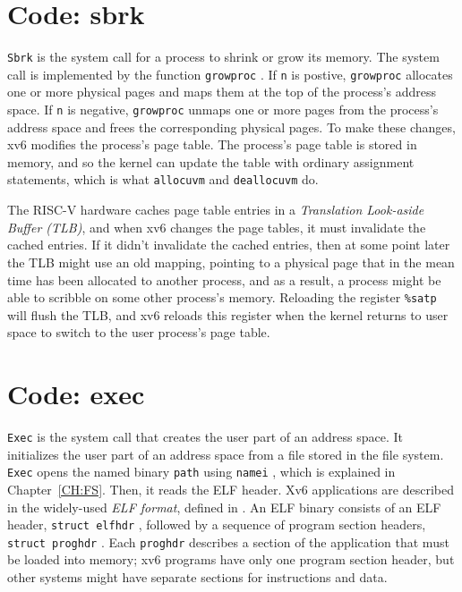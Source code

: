 \section{Code: sbrk}
\lstinline{Sbrk}
is the system call for a process to shrink or grow its memory. The system
call is implemented by the function
\lstinline{growproc}
.
If
\lstinline{n}
is postive,
\lstinline{growproc}
allocates one or more physical pages and maps them at the top of the process's
address space.  If
\lstinline{n}
is negative,
\lstinline{growproc}
unmaps one or more pages from the process's address space and frees the corresponding
physical pages.
To make these changes,
xv6 modifies the process's page table.  The process's page table is stored in
memory, and so the kernel can update the table with ordinary assignment
statements, which is what
\lstinline{allocuvm}
and
\lstinline{deallocuvm}
do.

The RISC-V hardware caches page table entries in a
\textit{Translation Look-aside Buffer (TLB)},
and when xv6 changes the page tables, it must invalidate the cached entries.  If
it didn't invalidate the cached entries, then at some point later the TLB might
use an old mapping, pointing to a physical page that in the mean time has been
allocated to another process, and as a result, a process might be able to
scribble on some other process's memory.  Reloading the register
\texttt{\%satp}
will flush the TLB, and xv6 reloads this register
when the kernel returns to user space to switch to the user process's
page table.
\section{Code: exec}
\lstinline{Exec}
is the system call that creates the user part of an address space.  It
initializes the user part of an address space from a file stored in the file
system.
\lstinline{Exec}
opens the named binary
\lstinline{path}
using
\lstinline{namei}
,
which is explained in Chapter~\ref{CH:FS}.
Then, it reads the ELF header. Xv6 applications are described in the widely-used
\textit{ELF format},
defined in
.
An ELF binary consists of an ELF header,
\lstinline{struct elfhdr}
,
followed by a sequence of program section headers,
\lstinline{struct proghdr}
.
Each
\lstinline{proghdr}
describes a section of the application that must be loaded into memory;
xv6 programs have only one program section header, but
other systems might have separate sections
for instructions and data.

